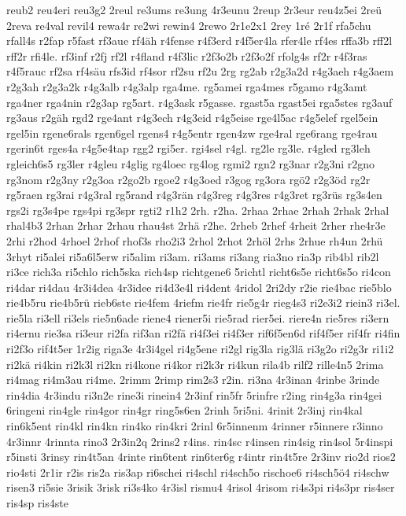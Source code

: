 {reub2
reu4eri
reu3g2
2reul
re3ums
re3ung
4r3eunu
2reup
2r3eur
reu4z5ei
2reü
2reva
re4val
revil4
rewa4r
re2wi
rewin4
2rewo
2r1e2x1
2rey
1ré
2r1f
rfa5chu
rfall4s
r2fap
r5fast
rf3aue
rf4äh
r4fense
r4f3erd
r4f5er4la
rfer4le
rf4es
rffa3b
rff2l
rff2r
rfi4le.
rf3inf
r2fj
rf2l
r4fland
r4f3lic
r2f3o2b
r2f3o2f
rfolg4s
rf2r
r4f3ras
r4f5rauc
rf2sa
rf4säu
rfs3id
rf4sor
rf2su
rf2u
2rg
rg2ab
r2g3a2d
r4g3aeh
r4g3aem
r2g3ah
r2g3a2k
r4g3alb
r4g3alp
rga4me.
rg5amei
rga4mes
r5gamo
r4g3amt
rga4ner
rga4nin
r2g3ap
rg5art.
r4g3ask
r5gasse.
rgast5a
rgast5ei
rga5stes
rg3auf
rg3aus
r2gäh
rgd2
rge4ant
r4g3ech
r4g3eid
r4g5eise
rge4l5ac
r4g5elef
rgel5ein
rgel5in
rgene6rals
rgen6gel
rgens4
r4g5entr
rgen4zw
rge4ral
rge6rang
rge4rau
rgerin6t
rges4a
r4g5e4tap
rgg2
rgi5er.
rgi4sel
r4gl.
rg2le
rg3le.
r4gled
rg3leh
rgleich6s5
rg3ler
r4gleu
r4glig
rg4loec
rg4log
rgmi2
rgn2
rg3nar
r2g3ni
r2gno
rg3nom
r2g3ny
r2g3oa
r2go2b
rgoe2
r4g3oed
r3gog
rg3ora
rgö2
r2g3öd
rg2r
rg5raen
rg3rai
r4g3ral
rg5rand
r4g3rän
r4g3reg
r4g3res
r4g3ret
rg3rüs
rg3s4en
rgs2i
rg3s4pe
rgs4pi
rg3spr
rgti2
r1h2
2rh.
r2ha.
2rhaa
2rhae
2rhah
2rhak
2rhal
rhal4b3
2rhan
2rhar
2rhau
rhau4st
2rhä
r2he.
2rheb
2rhef
4rheit
2rher
rhe4r3e
2rhi
r2hod
4rhoel
2rhof
rhof3s
rho2i3
2rhol
2rhot
2rhöl
2rhs
2rhue
rh4un
2rhü
3rhyt
ri5alei
ri5a6l5erw
ri5alim
ri3am.
ri3ams
ri3ang
ria3no
ria3p
rib4bl
rib2l
ri3ce
rich3a
ri5chlo
rich5ska
rich4sp
richtgene6
5richtl
richt6s5e
richt6s5o
ri4con
ri4dar
ri4dau
4r3i4dea
4r3idee
ri4d3e4l
ri4dent
4ridol
2ri2dy
r2ie
rie4bac
rie5blo
rie4b5ru
rie4b5rü
rieb6ste
rie4fem
4riefm
rie4fr
rie5g4r
rieg4s3
ri2e3i2
riein3
ri3el.
rie5la
ri3ell
ri3els
rie5n6ade
riene4
riener5i
rie5rad
rier5ei.
riere4n
rie5res
ri3ern
ri4ernu
rie3sa
ri3eur
ri2fa
rif3an
ri2fä
ri4f3ei
ri4f3er
rif6f5en6d
rif4f5er
rif4fr
ri4fin
ri2f3o
rif4t5er
1r2ig
riga3e
4r3i4gel
ri4g5ene
ri2gl
rig3la
rig3lä
ri3g2o
ri2g3r
ri1i2
ri2kä
ri4kin
ri2k3l
ri2kn
ri4kone
ri4kor
ri2k3r
ri4kun
rila4b
rilf2
rille4n5
2rima
ri4mag
ri4m3au
ri4me.
2rimm
2rimp
rim2s3
r2in.
ri3na
4r3inan
4rinbe
3rinde
rin4dia
4r3indu
ri3n2e
rine3i
rinein4
2r3inf
rin5fr
5rinfre
r2ing
rin4g3a
rin4gei
6ringeni
rin4gle
rin4gor
rin4gr
ring5s6en
2rinh
5ri5ni.
4rinit
2r3inj
rin4kal
rin6k5ent
rin4kl
rin4kn
rin4ko
rin4kri
2rinl
6r5innenm
4rinner
r5innere
r3inno
4r3innr
4rinnta
rino3
2r3in2q
2rins2
r4ins.
rin4sc
r4insen
rin4sig
rin4sol
5r4inspi
r5insti
3rinsy
rin4t5an
4rinte
rin6tent
rin6ter6g
r4intr
rin4t5re
2r3inv
rio2d
rios2
rio4sti
2r1ir
r2is
ris2a
ris3ap
ri6schei
ri4schl
ri4sch5o
rischoe6
ri4sch5ö4
ri4schw
risen3
ri5sie
3risik
3risk
ri3s4ko
4r3isl
rismu4
4risol
4risom
ri4s3pi
ri4s3pr
ris4ser
ris4sp
ris4ste
}
